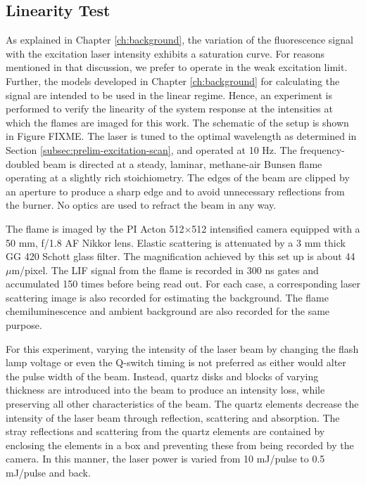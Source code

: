 \subsection{Linearity Test}
\label{subsec:prelim-linearity-test}

As explained in Chapter \ref{ch:background}, the variation of the fluorescence signal with the excitation laser intensity exhibits a saturation curve.
For reasons mentioned in that discussion, we prefer to operate in the weak excitation limit.
Further, the models developed in Chapter \ref{ch:background} for calculating the signal are intended to be used in the linear regime.
Hence, an experiment is performed to verify the linearity of the system response at the intensities at which the flames are imaged for this work.
The schematic of the setup is shown in Figure FIXME.
The laser is tuned to the optimal wavelength as determined in Section \ref{subsec:prelim-excitation-scan}, and operated at 10 Hz.
The frequency-doubled beam is directed at a steady, laminar, methane-air Bunsen flame operating at a slightly rich stoichiometry.
The edges of the beam are clipped by an aperture to produce a sharp edge and to avoid unnecessary reflections from the burner.
No optics are used to refract the beam in any way.

The flame is imaged by the PI Acton 512\(\times\)512 intensified camera equipped with a 50 mm, f/1.8 AF Nikkor lens.
Elastic scattering is attenuated by a 3 mm thick GG 420 Schott glass filter.
The magnification achieved by this set up is about 44 \(\mu\)m/pixel.
The LIF signal from the flame is recorded in 300 ns gates and accumulated 150 times before being read out.
For each case, a corresponding laser scattering image is also recorded for estimating the background.
The flame chemiluminescence and ambient background are also recorded for the same purpose.

For this experiment, varying the intensity of the laser beam by changing the flash lamp voltage or even the Q-switch timing is not preferred as either would alter the pulse width of the beam.
Instead, quartz disks and blocks of varying thickness are introduced into the beam to produce an intensity loss, while preserving all other characteristics of the beam.
The quartz elements decrease the intensity of the laser beam through reflection, scattering and absorption.
The stray reflections and scattering from the quartz elements are contained by enclosing the elements in a box and preventing these from being recorded by the camera.
In this manner, the laser power is varied from 10 mJ/pulse to 0.5 mJ/pulse and back.

